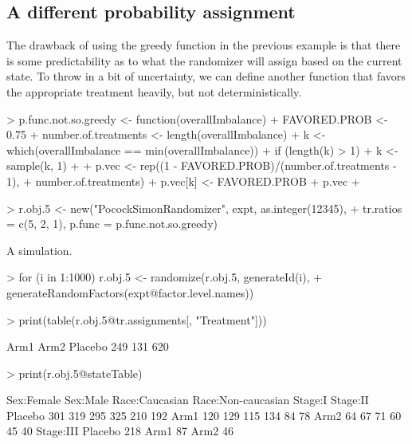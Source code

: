 \documentclass[11pt, letter]{article}
\numberwithin{equation}{section}
\begin{document}
\subsection{A different probability assignment}
\label{sec:diff-prob}

The drawback of using the greedy function in the previous example is
that there is some predictability as to what the randomizer will
assign based on the current state.  To throw in a bit of uncertainty,
we can define another function that favors the appropriate treatment
heavily, but not deterministically.

\begin{Schunk}
\begin{Sinput}
> p.func.not.so.greedy <- function(overallImbalance) {
+     FAVORED.PROB <- 0.75
+     number.of.treatments <- length(overallImbalance)
+     k <- which(overallImbalance == min(overallImbalance))
+     if (length(k) > 1) {
+         k <- sample(k, 1)
+     }
+     p.vec <- rep((1 - FAVORED.PROB)/(number.of.treatments - 1), 
+         number.of.treatments)
+     p.vec[k] <- FAVORED.PROB
+     p.vec
+ }
\end{Sinput}
\end{Schunk}

\begin{Schunk}
\begin{Sinput}
> r.obj.5 <- new("PocockSimonRandomizer", expt, as.integer(12345), 
+     tr.ratios = c(5, 2, 1), p.func = p.func.not.so.greedy)
\end{Sinput}
\end{Schunk}

A simulation.

\begin{Schunk}
\begin{Sinput}
> for (i in 1:1000) r.obj.5 <- randomize(r.obj.5, generateId(i), 
+     generateRandomFactors(expt@factor.level.names))
\end{Sinput}
\end{Schunk}

\begin{Schunk}
\begin{Sinput}
> print(table(r.obj.5@tr.assignments[, "Treatment"]))
\end{Sinput}
\begin{Soutput}
   Arm1    Arm2 Placebo 
    249     131     620 
\end{Soutput}
\begin{Sinput}
> print(r.obj.5@stateTable)
\end{Sinput}
\begin{Soutput}
        Sex:Female Sex:Male Race:Caucasian Race:Non-caucasian Stage:I Stage:II
Placebo        301      319            295                325     210      192
Arm1           120      129            115                134      84       78
Arm2            64       67             71                 60      45       40
        Stage:III
Placebo       218
Arm1           87
Arm2           46
\end{Soutput}
\end{Schunk}
\end{document}
